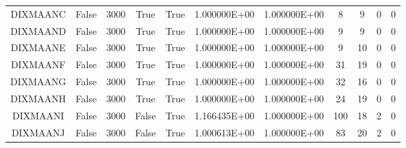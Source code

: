 \begin{longtable}{ccccccccccc}
	\cellcolor{default1} DIXMAANC& \cellcolor{default1} False& \cellcolor{default1} 3000& \cellcolor{default1} True& \cellcolor{default1} True& \cellcolor{best} 1.000000E+00& \cellcolor{best} 1.000000E+00& \cellcolor{best} 8& \cellcolor{ok} 9& \cellcolor{default1} 0& \cellcolor{default1} 0\\
	\cellcolor{default2} DIXMAAND& \cellcolor{default2} False& \cellcolor{default2} 3000& \cellcolor{default2} True& \cellcolor{default2} True& \cellcolor{best} 1.000000E+00& \cellcolor{best} 1.000000E+00& \cellcolor{best} 9& \cellcolor{best} 9& \cellcolor{default2} 0& \cellcolor{default2} 0\\
	\cellcolor{default1} DIXMAANE& \cellcolor{default1} False& \cellcolor{default1} 3000& \cellcolor{default1} True& \cellcolor{default1} True& \cellcolor{best} 1.000000E+00& \cellcolor{best} 1.000000E+00& \cellcolor{best} 9& \cellcolor{ok} 10& \cellcolor{default1} 0& \cellcolor{default1} 0\\
	\cellcolor{default2} DIXMAANF& \cellcolor{default2} False& \cellcolor{default2} 3000& \cellcolor{default2} True& \cellcolor{default2} True& \cellcolor{best} 1.000000E+00& \cellcolor{best} 1.000000E+00& \cellcolor{ok} 31& \cellcolor{best} 19& \cellcolor{default2} 0& \cellcolor{default2} 0\\
	\cellcolor{default1} DIXMAANG& \cellcolor{default1} False& \cellcolor{default1} 3000& \cellcolor{default1} True& \cellcolor{default1} True& \cellcolor{best} 1.000000E+00& \cellcolor{best} 1.000000E+00& \cellcolor{ok} 32& \cellcolor{best} 16& \cellcolor{default1} 0& \cellcolor{default1} 0\\
	\cellcolor{default2} DIXMAANH& \cellcolor{default2} False& \cellcolor{default2} 3000& \cellcolor{default2} True& \cellcolor{default2} True& \cellcolor{best} 1.000000E+00& \cellcolor{best} 1.000000E+00& \cellcolor{ok} 24& \cellcolor{best} 19& \cellcolor{default2} 0& \cellcolor{default2} 0\\
	\cellcolor{default1} DIXMAANI& \cellcolor{default1} False& \cellcolor{default1} 3000& \cellcolor{default1} False& \cellcolor{default1} True& \cellcolor{poor} 1.166435E+00& \cellcolor{best} 1.000000E+00& \cellcolor{poor} 100& \cellcolor{best} 18& \cellcolor{default1} 2& \cellcolor{default1} 0\\
	\cellcolor{default2} DIXMAANJ& \cellcolor{default2} False& \cellcolor{default2} 3000& \cellcolor{default2} False& \cellcolor{default2} True& \cellcolor{poor} 1.000613E+00& \cellcolor{best} 1.000000E+00& \cellcolor{poor} 83& \cellcolor{best} 20& \cellcolor{default2} 2& \cellcolor{default2} 0\\

\end{longtable}
